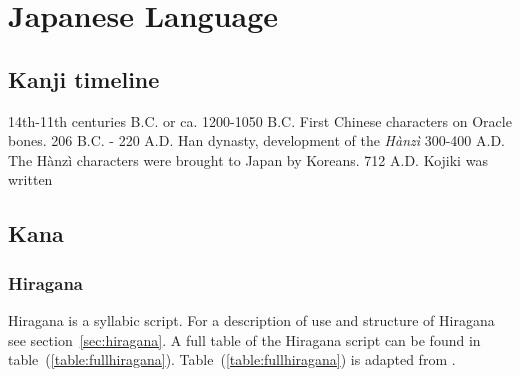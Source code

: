 
\chapter{Japanese Language}
\label{chap:app:japaneselanguage}

\section{Kanji timeline}
\label{sec:app:kanjitimeline}



14th-11th centuries B.C. or ca. 1200-1050 B.C. First Chinese characters on Oracle bones. 
206 B.C. - 220 A.D. Han dynasty, development of the \emph{Hànzì}
300-400 A.D. The Hànzì characters were brought to Japan by Koreans.
712 A.D. Kojiki was written


\section{Kana }
\label{sec:app:kana}

\subsection{Hiragana }
\label{sec:app:hiragana}

Hiragana is a syllabic script. For a description of use and structure of
Hiragana see section~\ref{sec:hiragana}. A full table of the Hiragana script can 
be found in table~(\ref{table:fullhiragana}).
Table~(\ref{table:fullhiragana}) is adapted from .

